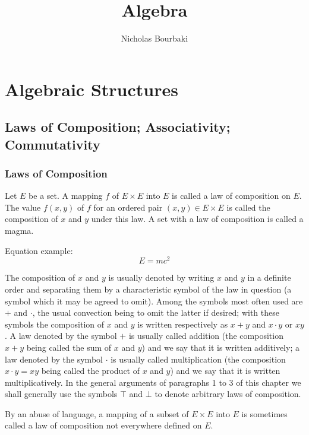 \documentclass[twoside,usebookdim]{bourbaki}
\title{Algebra}
\author{Nicholas Bourbaki}
\begin{document}
\frontmatter
\maketitle
\tableofcontents
\mainmatter
\chapter{Algebraic Structures}
\section{Laws of Composition; Associativity; Commutativity}
\subsection{Laws of Composition}

\begin{definition}
Let $E$ be a set. A mapping $f$ of $E\times E$ into $E$ is called a law
of composition on $E$. The value $f(x,y)$ of $f$ for an ordered pair
$(x,y)\in E\times E$ is called the composition of $x$ and $y$ under this
law. A set with a law of composition is called a magma.
\end{definition}

Equation example:
\begin{equation}
E = mc^{2}
\end{equation}

The composition of $x$ and $y$ is usually denoted by writing $x$ and $y$
in a definite order and separating them by a characteristic symbol of
the law in question (a symbol which it may be agreed to omit). Among the
symbols most often used are $+$ and $\cdot$, the usual convection being
to omit the latter if desired; with these symbols the composition of $x$
and $y$ is written respectively as $x + y$ and $x\cdot y$ or $xy$.
A law denoted by the symbol $+$ is usually called addition (the
composition $x + y$ being called the sum of $x$ and $y$) and we say that
it is written additively; a law denoted by the symbol $\cdot$ is usually
called multiplication (the composition $x\cdot y = xy$ being called the
product of $x$ and $y$) and we say that it is written
multiplicatively. In the general arguments of paragraphs 1 to 3 of this
chapter we shall generally use the symbols $\mathbin{\top}$ and $\bot$ to denote
arbitrary laws of composition.

By an abuse of language, a mapping of a subset of $E\times E$ into $E$
is sometimes called a law of composition not everywhere defined on $E$.
\end{document}
